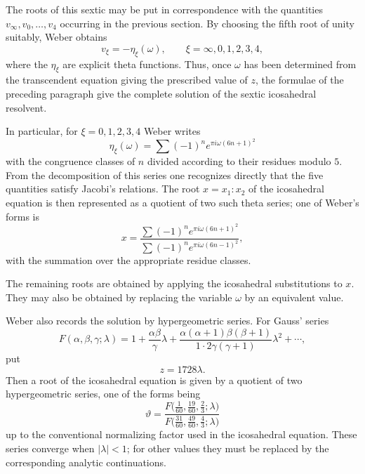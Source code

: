 \documentclass[11pt,a4paper]{book}
\begin{document}
The roots of this sextic may be put in correspondence with the quantities $v_\infty,v_0,
\ldots,v_4$ occurring in the previous section.  By choosing the fifth root of unity suitably, Weber obtains
\begin{equation}
 v_\xi=-\eta_\xi(\omega),
 \qquad \xi=\infty,0,1,2,3,4,
\end{equation}
where the $\eta_\xi$ are explicit theta functions.  Thus, once $\omega$ has been determined from the transcendent equation giving the prescribed value of $z$, the formulae of the preceding paragraph give the complete solution of the sextic icosahedral resolvent.

In particular, for $\xi=0,1,2,3,4$ Weber writes
\begin{equation}
 \eta_\xi(\omega)=\sum (-1)^{n}e^{\pi i\omega(6n+1)^2}
\end{equation}
with the congruence classes of $n$ divided according to their residues modulo $5$.  From the decomposition of this series one recognizes directly that the five quantities satisfy Jacobi's relations.  The root $x=x_1:x_2$ of the icosahedral equation is then represented as a quotient of two such theta series; one of Weber's forms is
\begin{equation}
 x=\frac{\sum (-1)^n e^{\pi i\omega(6n+1)^2}}
         {\sum (-1)^n e^{\pi i\omega(6n-1)^2}},
\end{equation}
with the summation over the appropriate residue classes.

The remaining roots are obtained by applying the icosahedral substitutions to $x$.  They may also be obtained by replacing the variable $\omega$ by an equivalent value.

Weber also records the solution by hypergeometric series.  For Gauss' series
\[
 F(\alpha,\beta,\gamma;\lambda)
 =1+\frac{\alpha\beta}{\gamma}\lambda
 +\frac{\alpha(\alpha+1)\beta(\beta+1)}{1\cdot2\gamma(\gamma+1)}\lambda^2+
 \cdots,
\]
put
\[
 z=1728\lambda.
\]
Then a root of the icosahedral equation is given by a quotient of two hypergeometric series, one of the forms being
\begin{equation}
 \vartheta=
 \frac{F\bigl(\frac{1}{60},\frac{19}{60},\frac{2}{3};\lambda\bigr)}
      {F\bigl(\frac{31}{60},\frac{49}{60},\frac{4}{3};\lambda\bigr)}
\end{equation}
up to the conventional normalizing factor used in the icosahedral equation.  These series converge when $|\lambda|<1$; for other values they must be replaced by the corresponding analytic continuations.
\end{document}
